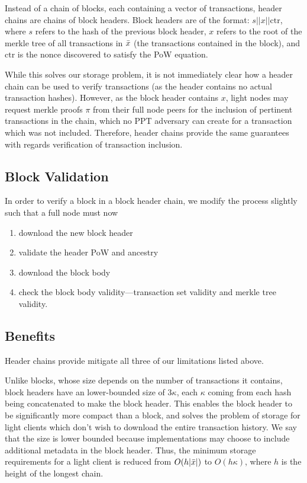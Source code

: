 Instead of a chain of blocks, each containing a vector of transactions, header chains are chains of block headers. Block headers are of the format: $s || x || \text{ctr}$, where $s$ refers to the hash of the previous block header, $x$ refers to the root of the merkle tree of all transactions in $\Bar{x}$ (the transactions contained in the block), and $\text{ctr}$ is the nonce discovered to satisfy the PoW equation.

While this solves our storage problem, it is not immediately clear how a header chain can be used to verify transactions (as the header contains no actual transaction hashes). However, as the block header contains $x$, light nodes may request merkle proofs $\pi$ from their full node peers for the inclusion of pertinent transactions in the chain, which no PPT adversary can create for a transaction which was not included. Therefore, header chains provide the same guarantees with regards verification of transaction inclusion.

\subsection{Block Validation}
In order to verify a block in a block header chain, we modify the process slightly such that a full node must now
\begin{enumerate}
    \item download the new block header
    \item validate the header PoW and ancestry
    \item download the block body
    \item check the block body validity---transaction set validity and merkle tree validity.
\end{enumerate}

\subsection{Benefits}
Header chains provide mitigate all three of our limitations listed above.

Unlike blocks, whose size depends on the number of transactions it contains, block headers have an lower-bounded size of $3\kappa$, each $\kappa$ coming from each hash being concatenated to make the block header. This enables the block header to be significantly more compact than a block, and solves the problem of storage for light clients which don't wish to download the entire transaction history. We say that the size is lower bounded because implementations may choose to include additional metadata in the block header. Thus, the minimum storage requirements for a light client is reduced from $O(h|\Bar{x}|)$ to $O(h \kappa)$, where $h$ is the height of the longest chain.

